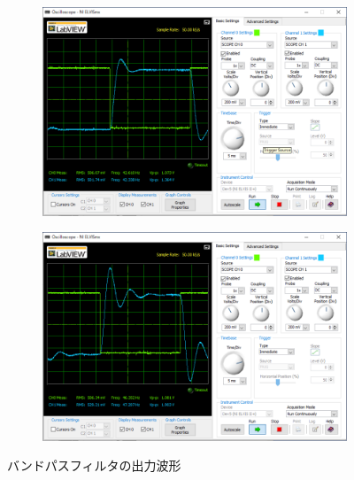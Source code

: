 \begin{figure}
	\centering
	\begin{subfigure}{0.8\linewidth}
		\addtocounter{subfigure}{2}
		\centering
		\includegraphics[width=0.8\linewidth]{src/figures/exp10/10k-low-sq.png}
	\end{subfigure}
	\begin{subfigure}{0.8\linewidth}
		\centering
		\includegraphics[width=0.8\linewidth]{src/figures/exp10/20k-low-sq.png}
	\end{subfigure}
	\caption{バンドパスフィルタの出力波形}
	\label{fig:exp10-band-sq}
\end{figure}
